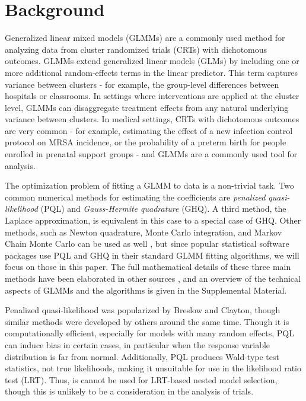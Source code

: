 \documentclass[Afour,times,sagev,doublespace]{sagej}
\begin{document}
\section{Background}
Generalized linear mixed models (GLMMs) are a commonly used method for analyzing data from cluster randomized trials (CRTs) with dichotomous outcomes. GLMMs extend generalized linear models (GLMs) by including one or more additional random-effects terms in the linear predictor. This term captures variance between clusters - for example, the group-level differences between hospitals or classrooms. In settings where interventions are applied at the cluster level, GLMMs can disaggregate treatment effects from any natural underlying variance between clusters. In medical settings, CRTs with dichotomous outcomes are very common - for example, estimating the effect of a new infection control protocol on MRSA incidence, or the probability of a preterm birth for people enrolled in prenatal support groups - and GLMMs are a commonly used tool for analysis. 

The optimization problem of fitting a GLMM to data is a non-trivial task. Two common numerical methods for estimating the coefficients are \textit{penalized quasi-likelihood} (PQL) \cite{wolfinger_generalized_1993} and \textit{Gauss-Hermite quadrature} (GHQ). A third method, the Laplace approximation, is equivalent in this case to a special case of GHQ\cite{liu_note_1994}. Other methods, such as Newton quadrature, Monte Carlo integration, and Markov Chain Monte Carlo can be used as well \cite{zhang_fitting_2011}, but since popular statistical software packages use PQL and GHQ in their standard GLMM fitting algorithms, we will focus on those in this paper. The full mathematical details of these three main methods have been elaborated in other sources \cite{wolfinger_generalized_1993}\cite{pinheiro_efficient_2006}, and an overview of the technical aspects of GLMMs and the algorithms is given in the Supplemental Material.

Penalized quasi-likelihood was popularized by Breslow and Clayton\cite{breslow_approximate_1993}, though similar methods were developed by others\cite{zeger_models_1988}\cite{engel_simple_1994} around the same time. Though it is computationally efficient, especially for models with many random effects, PQL can induce bias in certain cases, in particular when the response variable distribution is far from normal\cite{agresti_categorical_2013}\cite{rodriguez_assessment_1995}\cite{breslow_bias_1995}\cite{lin_bias_1996}. Additionally, PQL produces Wald-type test statistics, not true likelihoods, making it unsuitable for use in the likelihood ratio test (LRT). Thus, is cannot be used for LRT-based nested model selection\cite{zhang_fitting_2011}\cite{pinheiro_efficient_2006}\cite{ng_estimation_2006}, though this is unlikely to be a consideration in the analysis of trials.
\end{document}
